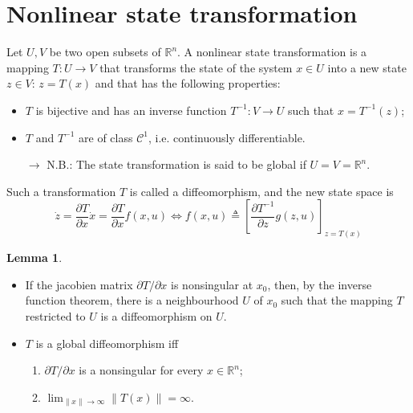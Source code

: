 \documentclass[12pt, openany]{report}
\theoremstyle{definition}
\newtheorem{lem}[thm]{Lemma}
\newcommand{\R}{\mathbb{R}}
\begin{document}
\section{Nonlinear state transformation}
Let \(U,V\) be two open subsets of \(\R^n\). A nonlinear state transformation is a mapping \(T: U\rightarrow V\) that transforms the state of the system \(x\in U\) into a new state \(z\in V\): \(z=T(x)\) and that has the following properties:
\begin{itemize}
    \item \(T\) is bijective and has an inverse function \(T^{-1}:V\rightarrow U\) such that \(x=T^{-1}(z)\);
    \item \(T\) and \(T^{-1}\) are of class \(\mathcal{C}^1\), i.e. continuously differentiable. 
    \item [\(\rightarrow\)] N.B.: The state transformation is said to be global if \(U=V=\R^n\).
\end{itemize}
Such a transformation \(T\) is called a diffeomorphism, and the new state space is 
\begin{equation}
    \dot z = \frac{\partial T}{\partial x}\dot x = \frac{\partial T}{\partial x}f(x,u) \Longleftrightarrow f(x,u) \triangleq \left[\frac{\partial T^{-1}}{\partial z}g(z,u)\right]_{z=T(x)}
\end{equation}
\begin{lem}
    \begin{itemize}
        \item If the jacobien matrix \(\partial T/\partial x\) is nonsingular at \(x_0\), then, by the inverse function theorem, there is a neighbourhood \(U\) of \(x_0\) such that the mapping \(T\) restricted to \(U\) is a diffeomorphism on \(U\).
        \item \(T\) is a global diffeomorphism iff \begin{enumerate}
            \item \(\partial T/\partial x\) is a nonsingular for every \(x\in \R^n\);
            \item \(\lim_{\lVert x\rVert \rightarrow \infty} \lVert T(x)\rVert =\infty\).
        \end{enumerate}
    \end{itemize}
\end{lem}
\end{document}
